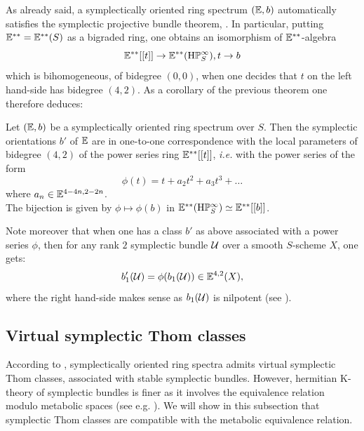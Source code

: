 \begin{num}\label{num:Sp-proj-bdl}
As already said, a symplectically oriented ring spectrum $(\mathbb E,b)$ automatically satisfies
 the symplectic projective bundle theorem, \cite[Th. 2.2.3]{DF3}.
 In particular, putting $\mathbb E^{**}=\mathbb E^{**}(S)$ as a bigraded ring,
 one obtains an isomorphism of $\mathbb E^{**}$-algebra
$$
\mathbb E^{**} [[t]] \rightarrow \mathbb E^{**}(\mathrm{H}\mathbb P^\infty_S), t \rightarrow b
$$
which is bihomogeneous, of bidegree $(0,0)$,
 when one decides that $t$ on the left hand-side has bidegree $(4,2)$.
 As a corollary of the previous theorem one therefore deduces:
\end{num}
\begin{cor}\label{cor:chg_Sp-orient}
Let $(\mathbb E,b)$ be a symplectically oriented ring spectrum over $S$.
 Then the symplectic orientations $b'$ of $\mathbb E$ are in one-to-one correspondence
 with the local parameters of bidegree $(4,2)$ of the power series ring $\mathbb E^{**}[[t]]$,
 \emph{i.e.} with the power series of the form
$$
\phi(t)=t+a_2t^2+a_3t^3+\hdots
$$
where $a_n \in \mathbb E^{4-4n,2-2n}$.  \\
 The bijection is given by $\phi \mapsto \phi(b)$ in
 $\mathbb E^{**}(\mathrm{H}\mathbb P^\infty_S) \simeq \mathbb E^{**}[[b]]$.
\end{cor}
Note moreover that when one has a class $b'$ as above associated
 with a power series $\phi$, then for any rank $2$ symplectic
 bundle $\mathcal U$ over a smooth $S$-scheme $X$, one gets:
\begin{equation}\label{eq:firstBorel&chg_orient}
b'_1(\mathcal U)=\phi(b_1(\mathcal U)) \in \mathbb E^{4,2}(X),
\end{equation}
where the right hand-side makes sense as $b_1(\mathcal U)$ is nilpotent
 (see \cite{DF3}).

\subsection{Virtual symplectic Thom classes}\label{sec:virt_symplect}

According to ,
 symplectically oriented ring spectra admits virtual symplectic Thom classes,
 associated with stable symplectic bundles. However, hermitian K-theory of symplectic bundles
 is finer as it involves the equivalence relation modulo metabolic spaces (see e.g. \cite{Kneb}).
 We will show in this subsection that symplectic Thom classes are compatible with
 the metabolic equivalence relation.

